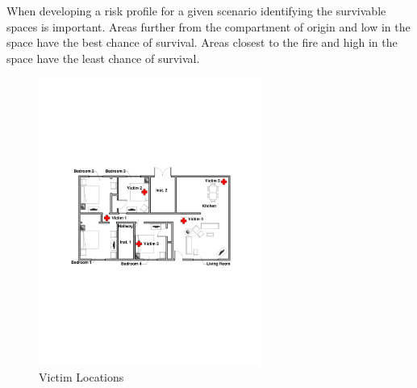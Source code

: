 \documentclass[12pt,oneside]{book}
\begin{document}
When developing a risk profile for a given scenario identifying the survivable spaces is important. Areas further from the compartment of origin and low in the space have the best chance of survival. Areas closest to the fire and high in the space have the least chance of survival. 

\begin{figure}[H]
\centering
\includegraphics[width=0.65\textwidth]{../0_Images/Instrumentation/Victim_Locations_New}
\caption{Victim Locations}
\label{fig:tc_vic_Loc_survivable_spaces}
\end{figure}
\end{document}
